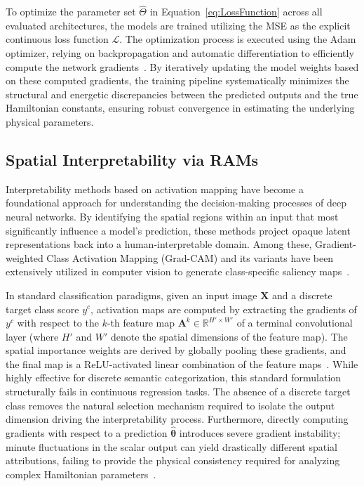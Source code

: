 \documentclass[a4paper,fleqn]{cas-sc}
\begin{document}
\begin{itemize}
To optimize the parameter set $\hat{\Theta}$ in Equation~\ref{eq:LossFunction} across all evaluated architectures, the models are trained utilizing the MSE as the explicit continuous loss function $\mathcal{L}$. The optimization process is executed using the Adam optimizer, relying on backpropagation and automatic differentiation to efficiently compute the network gradients~\cite{murakami2022inverse}. By iteratively updating the model weights based on these computed gradients, the training pipeline systematically minimizes the structural and energetic discrepancies between the predicted outputs and the true Hamiltonian constants, ensuring robust convergence in estimating the underlying physical parameters.

\end{itemize}


\subsection{Spatial Interpretability via RAMs}\label{sec:RAMs}

Interpretability methods based on activation mapping have become a foundational approach for understanding the decision-making processes of deep neural networks. By identifying the spatial regions within an input that most significantly influence a model's prediction, these methods project opaque latent representations back into a human-interpretable domain. Among these, Gradient-weighted Class Activation Mapping (Grad-CAM) and its variants have been extensively utilized in computer vision to generate class-specific saliency maps~\cite{vinogradova2020gradcam}. 

In standard classification paradigms, given an input image $\mathbf{X}$ and a discrete target class score $y^c$, activation maps are computed by extracting the gradients of $y^c$ with respect to the $k$-th feature map $\mathbf{A}^k \in \mathbb{R}^{H' \times W'}$ of a terminal convolutional layer (where $H'$ and $W'$ denote the spatial dimensions of the feature map). The spatial importance weights are derived by globally pooling these gradients, and the final map is a ReLU-activated linear combination of the feature maps~\cite{zhang2024gradcam}. While highly effective for discrete semantic categorization, this standard formulation structurally fails in continuous regression tasks. The absence of a discrete target class removes the natural selection mechanism required to isolate the output dimension driving the interpretability process. Furthermore, directly computing gradients with respect to a prediction $\hat{\boldsymbol{\theta}}$ introduces severe gradient instability; minute fluctuations in the scalar output can yield drastically different spatial attributions, failing to provide the physical consistency required for analyzing complex Hamiltonian parameters~\cite{makke2024symbolic}.
\end{document}
